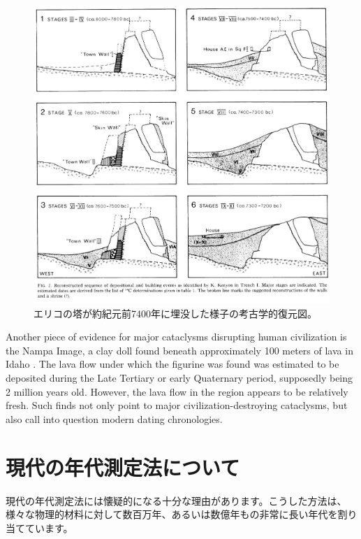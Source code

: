 \documentclass[10pt,twocolumn,letterpaper]{article}
\begin{document}
\begin{figure}[t]
\begin{center}
   \includegraphics[width=1\linewidth]{jericho.jpg}
\end{center}
   \caption{エリコの塔が約紀元前7400年に埋没した様子の考古学的復元図\cite{95}。}
\label{fig:14}
\label{fig:onecol}
\end{figure}
Another piece of evidence for major cataclysms disrupting human civilization is the Nampa Image, a clay doll found beneath approximately 100 meters of lava in Idaho \cite{102,103}. The lava flow under which the figurine was found was estimated to be deposited during the Late Tertiary or early Quaternary period, supposedly being 2 million years old. However, the lava flow in the region appears to be relatively fresh. Such finds not only point to major civilization-destroying cataclysms, but also call into question modern dating chronologies.

\section{現代の年代測定法について}

現代の年代測定法には懐疑的になる十分な理由があります。こうした方法は、様々な物理的材料に対して数百万年、あるいは数億年もの非常に長い年代を割り当てています。
\end{document}
